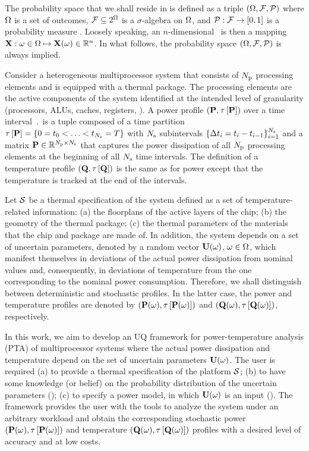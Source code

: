 The probability space that we shall reside in is defined as a triple $(\Omega, \mathcal{F}, \mathcal{P})$ where $\Omega$ is a set of outcomes, $\mathcal{F} \subseteq 2^\Omega$ is a $\sigma$-algebra on $\Omega$, and $\mathcal{P}: \mathcal{F} \to [0, 1]$ is a probability measure \cite{maitre2010}.
Loosely speaking, an $n$-dimensional \rv\ is then a mapping $\mathbf{X}: \omega \in \Omega \mapsto \mathbf{X}(\omega) \in \mathbb{R}^n$.
In what follows, the probability space $(\Omega, \mathcal{F}, \mathcal{P})$ is always implied.

Consider a heterogeneous multiprocessor system that consists of ${N_\text{p}}$ processing elements and is equipped with a thermal package.
The processing elements are the active components of the system identified at the intended level of granularity (processors, ALUs, caches, registers, \etc).
A power profile $\profP$ over a time interval $\period$ is a tuple composed of a time partition $\part{\mP} = \{ 0 = \t_0 < \dotsc < \t_{\steps} = \period \}$ with $N_\text{s}$ subintervals $\{ \Delta t_i = t_i - t_{i - 1} \}_{i = 1}^{N_\text{s}}$ and a matrix $\mP \in \real^{\cores \times \steps}$ that captures the power dissipation of all ${N_\text{p}}$ processing elements at the beginning of all $N_\text{s}$ time intervals.
The definition of a temperature profile $\profT$ is the same as for power except that the temperature is tracked at the end of the intervals.

Let $\mathcal{S}$ be a thermal specification of the system defined as a set of temperature-related information: (a) the floorplans of the active layers of the chip; (b) the geometry of the thermal package; (c) the thermal parameters of the materials that the chip and package are made of.
In addition, the system depends on a set of uncertain parameters, denoted by a random vector $\mathbf{U}(\omega)$, $\omega \in \Omega$, which manifest themselves in deviations of the actual power dissipation from nominal values and, consequently, in deviations of temperature from the one corresponding to the nominal power consumption.
Therefore, we shall distinguish between deterministic and stochastic profiles.
In the latter case, the power and temperature profiles are denoted by $\profP{\o}$ and $\profT{\o}$, respectively.

In this work, we aim to develop an UQ framework for power-temperature analysis (PTA) of multiprocessor systems where the actual power dissipation and temperature depend on the set of uncertain parameters $\mathbf{U}(\omega)$.
The user is required (a) to provide a thermal specification of the platform $\mathcal{S}$; (b) to have some knowledge (or belief) on the probability distribution of the uncertain parameters (); (c) to specify a power model, in which $\mathbf{U}(\omega)$ is an input ().
The framework provides the user with the tools to analyze the system under an arbitrary workload and obtain the corresponding stochastic power $\profP{\o}$ and temperature $\profT{\o}$ profiles with a desired level of accuracy and at low costs.

